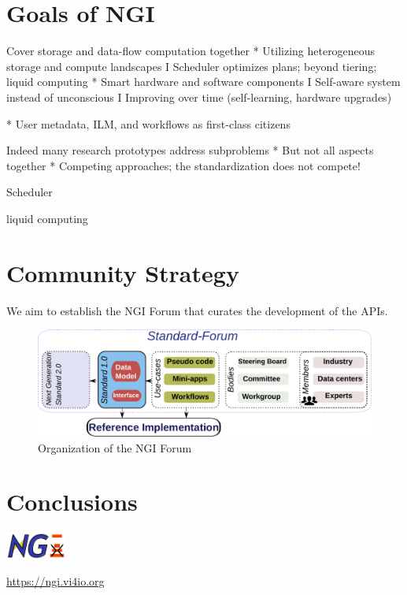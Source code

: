 \documentclass[a4paper, twocolumn]{article}
\begin{document}

\section{Goals of NGI}

Cover storage and data-flow computation together
* Utilizing heterogeneous storage and compute landscapes
I Scheduler optimizes plans; beyond tiering; liquid computing
* Smart hardware and software components
I Self-aware system instead of unconscious
I Improving over time (self-learning, hardware upgrades)

* User metadata, ILM, and workflows as first-class citizens

Indeed many research prototypes address subproblems
* But not all aspects together
* Competing approaches; the standardization does not compete!


Scheduler

liquid computing



\section{Community Strategy}

We aim to establish the NGI Forum that curates the development of the APIs.

\begin{figure}[b]
  \includegraphics[width=\columnwidth]{standardization}
  \caption{Organization of the NGI Forum}
  \label{fig:standardization}
\end{figure}

\section{Conclusions}

\includegraphics[width=2cm]{ngi-logo}

\noindent\url{https://ngi.vi4io.org}
\end{document}
